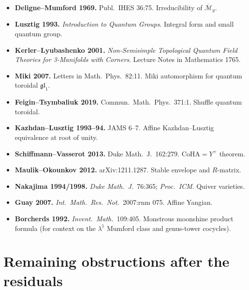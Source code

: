 \documentclass[11pt]{article}
\newcommand{\cM}{\mathcal{M}}
\newcommand{\fgl}{\mathfrak{gl}}
\begin{document}
\begin{itemize}[leftmargin=*]
  $\overline{\cM}_{g, n}$.
\item \textbf{Deligne--Mumford 1969.} Publ.~IHES 36:75. Irreducibility
  of $\overline{\cM}_g$.
\item \textbf{Lusztig 1993.} \emph{Introduction to Quantum Groups}.
  Integral form and small quantum group.
\item \textbf{Kerler--Lyubashenko 2001.} \emph{Non-Semisimple Topological
  Quantum Field Theories for 3-Manifolds with Corners}. Lecture Notes
  in Mathematics 1765.
\item \textbf{Miki 2007.} Letters in Math.~Phys.~82:11. Miki
  automorphism for quantum toroidal $\fgl_1$.
\item \textbf{Feigin--Tsymbaliuk 2019.} Commun.~Math.~Phys.~371:1. Shuffle
  quantum toroidal.
\item \textbf{Kazhdan--Lusztig 1993--94.} JAMS 6--7. Affine
  Kazhdan--Lusztig equivalence at root of unity.
\item \textbf{Schiffmann--Vasserot 2013.} Duke Math.~J.~162:279.
  CoHA$=Y^+$ theorem.
\item \textbf{Maulik--Okounkov 2012.} arXiv:1211.1287. Stable envelope
  and $R$-matrix.
\item \textbf{Nakajima 1994/1998.} \emph{Duke Math.~J.}~76:365; \emph{Proc.~ICM}.
  Quiver varieties.
\item \textbf{Guay 2007.} \emph{Int.~Math.~Res.~Not.}~2007:rnm 075.
  Affine Yangian.
\item \textbf{Borcherds 1992.} \emph{Invent.~Math.}~109:405. Monstrous
  moonshine product formula (for context on the $\lambda^1$ Mumford
  class and genus-tower cocycles).
\end{itemize}

\section{Remaining obstructions after the residuals}
\label{sec:remaining-obstructions}
\end{document}
